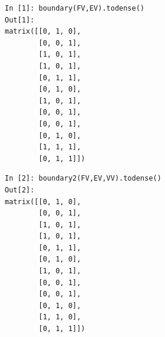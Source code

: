 \documentclass[11pt,oneside]{article}	%
\begin{document}
{\scriptsize
\begin{minipage}[c]{0.5\linewidth}
\centering
\begin{verbatim}
In [1]: boundary(FV,EV).todense()
Out[1]: 
matrix([[0, 1, 0],
        [0, 0, 1],
        [1, 0, 1],
        [1, 0, 1],
        [0, 1, 1],
        [0, 1, 0],
        [1, 0, 1],
        [0, 0, 1],
        [0, 0, 1],
        [0, 1, 0],
        [1, 1, 1],
        [0, 1, 1]])
\end{verbatim}
\end{minipage}
\begin{minipage}[c]{0.5\linewidth}
\centering
\begin{verbatim}
In [2]: boundary2(FV,EV,VV).todense()
Out[2]: 
matrix([[0, 1, 0],
        [0, 0, 1],
        [1, 0, 1],
        [1, 0, 1],
        [0, 1, 1],
        [0, 1, 0],
        [1, 0, 1],
        [0, 0, 1],
        [0, 0, 1],
        [0, 1, 0],
        [1, 1, 0],
        [0, 1, 1]])
\end{verbatim}
\end{minipage}}
\end{document}
